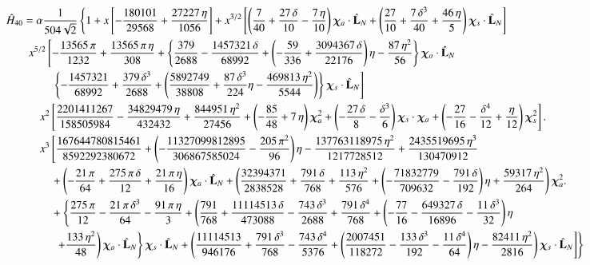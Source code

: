 \documentclass[twocolumn,showpacs,aps,prd,nobibnotes,floatfix]{revtex4-1}
\begin{document}
\begin{widetext}
\begin{subequations}
\begin{align}\label{eq:H40}
	&\hat{H}_{40} =\alpha\frac{1}{504\sqrt{2}}\left\{1 + x\left[-\frac{180101}{29568} + \frac{27227\,\eta}{1056}\right] + x^{3/2}\left[\left(\frac{7}{40} + \frac{27\,\delta}{10} -\frac{7\,\eta}{10}\right)\bm{\chi}_a \cdot \hat{\mathbf{L}}_N+\left(\frac{27}{10}+\frac{7\,\delta^3}{40} +\frac{46\,\eta}{5}\right)\bm{\chi}_s \cdot \hat{\mathbf{L}}_N\right]\right.\nonumber\\
	&\qquad x^{5/2}\left[-\frac{13565\,\pi}{1232} + \frac{13565\,\pi\,\eta}{308} + \left\{\frac{379}{2688}-\frac{1457321\,\delta}{68992}+\left(-\frac{59}{336} + \frac{3094367\,\delta}{22176}\right)\eta -\frac{87\,\eta^2}{56}\right\}\bm{\chi}_a \cdot \hat{\mathbf{L}}_N\right.\nonumber\\
	&\qquad\qquad \left. \left\{-\frac{1457321}{68992} + \frac{379\,\delta^3}{2688} + \left(\frac{5892749}{38808} + \frac{87\,\delta^3}{224}\eta-\frac{469813\,\eta^2}{5544}\right)\right\}\bm{\chi}_s \cdot \hat{\mathbf{L}}_N\right]\nonumber\\
	&\quad\qquad x^2\left[\frac{2201411267}{158505984} -\frac{34829479\,\eta}{432432} + \frac{844951\,\eta^2}{27456} + \left(-\frac{85}{48} + 7\,\eta\right)\bm{\chi}_a^2 + \left(-\frac{27\, \delta}{8} -\frac{\delta^3}{6}\right)\bm{\chi}_s \cdot \bm{\chi}_a + \left(-\frac{27}{16} -\frac{\delta^4}{12} + \frac{\eta}{12}\right)\bm{\chi}_s^2\right].\nonumber\\
	&\quad\qquad x^3\left[\frac{167644780815461}{8592292380672}+\left(-\frac{11327099812895}{306867585024} -\frac{205\,\pi^2}{96}\right)\eta -\frac{137763118975\,\eta^2}{1217728512} + \frac{2435519695\,\eta^3}{130470912}\right.\nonumber\\
	&\qquad\qquad  + \left(-\frac{21\,\pi}{64} + \frac{275\,\pi\,\delta}{12} + \frac{21\,\pi\,\eta}{16}\right)\bm{\chi}_a \cdot \hat{\mathbf{L}}_N + \left(\frac{32394371}{2838528} + \frac{791\,\delta}{768} + \frac{113\,\eta^2}{576} + \left(-\frac{71832779}{709632} -\frac{791\,\delta}{192}\right)\eta + \frac{59317\,\eta^2}{264}\right)\bm{\chi}_a^2 .\nonumber\\
	&\qquad\qquad + \left\{\frac{275\,\pi}{12} - \frac{21\,\pi\,\delta^3}{64} -\frac{91\,\pi\,\eta}{3} + \left(\frac{791}{768} + \frac{11114513\,\delta}{473088} -\frac{743\,\delta^3}{2688} + \frac{791\,\delta^4}{768} + \left(-\frac{77}{16} -\frac{649327\,\delta}{16896} -\frac{11\,\delta^3}{32}\right)\eta  \right.\right.\nonumber\\
	&\qquad\qquad \left.\left.\left. \left.+ \frac{133\,\eta^2}{48}\right)\bm{\chi}_a \cdot \hat{\mathbf{L}}_N\right\}\bm{\chi}_s \cdot \hat{\mathbf{L}}_N + \left(\frac{11114513}{946176} + \frac{791\,\delta^3}{768} -\frac{743\,\delta^4}{5376} + \left(\frac{2007451}{118272} -\frac{133\,\delta^3}{192} -\frac{11\,\delta^4}{64}\right)\eta - \frac{82411\,\eta^2}{2816}\right)\bm{\chi}_s \cdot \hat{\mathbf{L}}_N\right]\nonumber
	\right\}\\
\end{align}	


\end{subequations}
\end{widetext}
\end{document}
